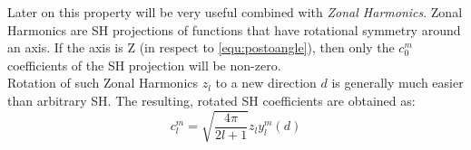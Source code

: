 \documentclass[thesis.tex]{subfiles}
\begin{document}
Later on this property will be very useful combined with \emph{Zonal Harmonics}.
Zonal Harmonics are SH projections of functions that have rotational symmetry around an axis.
If the axis is Z (in respect to \autoref{equ:postoangle}), then only the $c^m_0$ coefficients of the SH projection will be non-zero.\\
Rotation of such Zonal Harmonics $z_l$ to a new direction $d$ is generally much easier than arbitrary SH.
The resulting, rotated SH coefficients are obtained as:
\begin{equation} \label{eq:zonalrotate}
	c_l^m = \sqrt{\frac{4\pi}{2l+1}} z_l y_l^m(d)
\end{equation}

\subfilebib %
\end{document}
